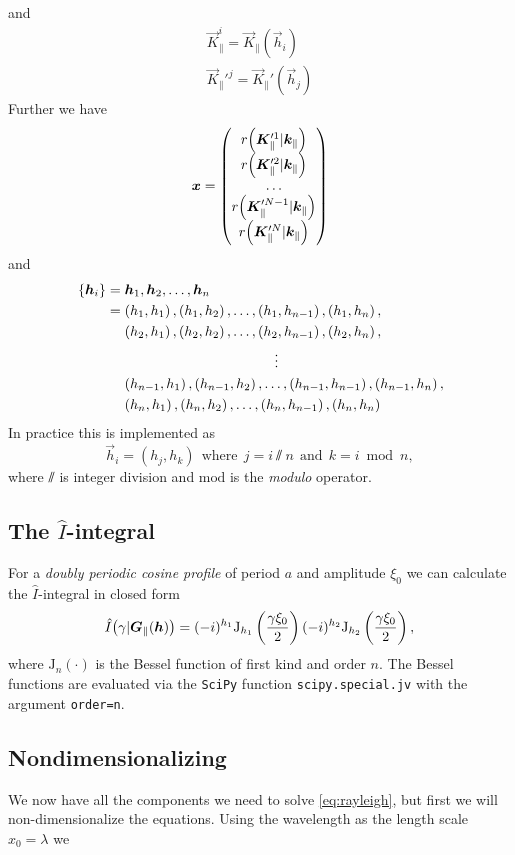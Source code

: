 and
\begin{align}
    \vec K_\|^{i} = \vec K_\| (\vec h_i) \\
    \vec K_\|'^{j} = \vec K_\|' (\vec h_j)
\end{align}
Further we have
\begin{equation}
    \vec x =
    \begin{pmatrix}
        r\del[2]{\vec K_\|'^{1} \vert \vec k_\|} \\
        r\del[2]{\vec K_\|'^{2} \vert \vec k_\|} \\
        \hdots \\
        r\del[2]{\vec K_\|'^{N-1} \vert \vec k_\|} \\
        r\del[2]{\vec K_\|'^{N} \vert \vec k_\|}
    \end{pmatrix}
\end{equation}
and
\begin{align*}
    &\cbr{\vec h_i} = \vec h_1, \vec h_2, \dots, \vec h_n \\
    &\phantom{\cbr{\vec h_i}{}} = \del{h_1, h_1}, \del{h_1, h_2}, \dots, \del{h_1, h_{n-1}}, \del{h_1, h_n}, \\
    &\phantom{\cbr{\vec h_i} = {}} \del{h_2, h_1}, \del{h_2, h_2}, \dots, \del{h_2, h_{n-1}}, \del{h_2, h_n}, \\
    &\hspace{5cm} \vdots \\
    &\phantom{\cbr{\vec h_i} = {}} \del{h_{n-1}, h_1}, \del{h_{n-1}, h_2}, \dots, \del{h_{n-1}, h_{n-1}}, \del{h_{n-1}, h_n}, \\
    &\phantom{\cbr{\vec h_i} = {}} \del{h_n, h_1}, \del{h_n, h_2}, \dots, \del{h_n, h_{n-1}}, \del{h_n, h_n} \\
\end{align*}
In practice this is implemented as
\begin{equation}
    \vec h_ i = (h_j, h_k) ~~\text{where}~~ j = i \sslash n ~~\text{and}~~ k = i \bmod n,
\end{equation}
where $\sslash$ is integer division and $\mathrm{mod}$ is the \emph{modulo} operator.

\subsection*{The $\hat I$-integral}
For a \emph{doubly periodic cosine profile} of period $a$ and amplitude $\xi_0$ we can calculate the $\hat I$-integral in closed form
\begin{equation}
    \hat I\del[1]{\gamma\vert \vec G_\|(\vec h)} = (-i)^{h_1} \mathrm{J}_{h_1}\del{\frac{\gamma\xi_0}{2}} (-i)^{h_2} \mathrm{J}_{h_2}\del{\frac{\gamma\xi_0}{2}},
\end{equation}
where $\mathrm{J}_n(\cdot)$ is the Bessel function of first kind and order $n$. The Bessel functions are evaluated via the \texttt{SciPy} function \texttt{scipy.special.jv} with the argument \texttt{order=n}.

\subsection*{Nondimensionalizing}
We now have all the components we need to solve \cref{eq:rayleigh}, but first we will non-dimensionalize the equations. Using the wavelength as the length scale $x_0 = \lambda$ we 